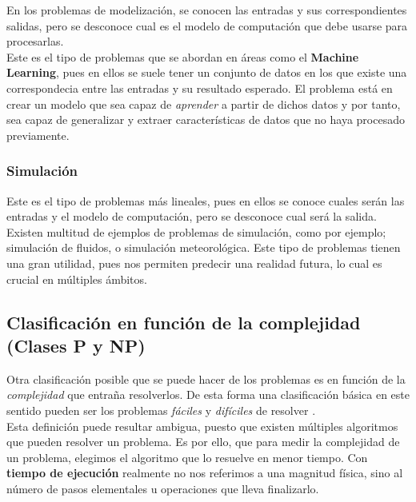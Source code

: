 En los problemas de modelización, se conocen las entradas y sus correspondientes salidas, pero se desconoce cual es el modelo de computación que debe usarse para procesarlas. \\


Este es el tipo de problemas que se abordan en áreas como el \textbf{Machine Learning}, pues en ellos se suele tener un conjunto de datos en los que existe una correspondecia entre las entradas y su resultado esperado. El problema está en crear un modelo que sea capaz de \textit{aprender} a partir de dichos datos y por tanto, sea capaz de generalizar y extraer características de datos que no haya procesado previamente.

\subsubsection{Simulación}

Este es el tipo de problemas más lineales, pues en ellos se conoce cuales serán las entradas y el modelo de computación, pero se desconoce cual será la salida. \\

Existen multitud de ejemplos de problemas de simulación, como por ejemplo; simulación de fluidos, o simulación meteorológica. Este tipo de problemas tienen una gran utilidad, pues nos permiten predecir una realidad futura, lo cual es crucial en múltiples ámbitos. \\


\subsection{Clasificación en función de la complejidad (Clases P y NP)}

Otra clasificación posible que se puede hacer de los problemas es en función de la \textit{complejidad} que entraña resolverlos. De esta forma una clasificación básica en este sentido pueden ser los problemas \textit{fáciles} y \textit{difíciles} de resolver \cite{garey2002computers}.\\

Esta definición puede resultar ambigua, puesto que existen múltiples algoritmos que pueden resolver un problema. Es por ello, que para medir la complejidad de un problema, elegimos el algoritmo que lo resuelve en menor tiempo. Con \textbf{tiempo de ejecución} realmente no nos referimos a una magnitud física, sino al número de pasos elementales u operaciones que lleva finalizarlo. \\

